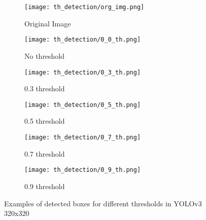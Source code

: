 \documentclass{article}
\begin{document}
\begin{figure}
    \begin{subfigure}{0.30\textwidth}%
        \centering
        \texttt{[image: th\_detection/org\_img.png]}
        \caption{Original Image}
        \label{fig:sfig1}
    \end{subfigure}     
    \begin{subfigure}{0.30\textwidth}%
        \centering
        \texttt{[image: th\_detection/0\_0\_th.png]}
        \caption{No threshold}
        \label{fig:sfig2}
    \end{subfigure}
    \begin{subfigure}{0.30\textwidth}%
        \centering
        \texttt{[image: th\_detection/0\_3\_th.png]}
        \caption{0.3 threshold}
        \label{fig:sfig3}
    \end{subfigure}


    
    \begin{subfigure}{0.30\textwidth}%
        \centering
        \texttt{[image: th\_detection/0\_5\_th.png]}
        \caption{0.5 threshold}
        \label{fig:sfig4}
    \end{subfigure}
    \begin{subfigure}{0.30\textwidth}%
        \centering
        \texttt{[image: th\_detection/0\_7\_th.png]}
        \caption{0.7 threshold}
        \label{fig:sfig5}
    \end{subfigure}
    \begin{subfigure}{0.30\textwidth}%
        \centering
        \texttt{[image: th\_detection/0\_9\_th.png]}
        \caption{0.9 threshold}
        \label{fig:sfig6}
    \end{subfigure}
    \caption{Examples of detected boxes for different thresholds in YOLOv3 320x320}
    \label{fig:exp_imgs}
\end{figure}
\end{document}
